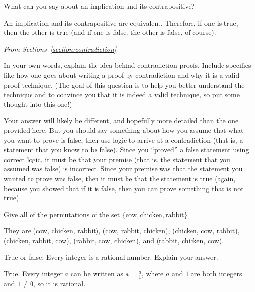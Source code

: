\begin{requ}
What can you say about an implication and its contrapositive?
\begin{requanswer}
An implication and its contrapositive are equivalent.
Therefore, if one is true, then the other is true
(and if one is false, the other is false, of course). 
\end{requanswer}
\end{requ}

\medskip
 
\noindent
{\em From Sections~\ref{section:contradiction}
\begin{requ}
In your own words, explain the idea behind contradiction proofs. Include specifics like how one goes about
writing a proof by contradiction and why it is a valid proof technique.
(The goal of this question is to help you better understand the technique and to convince you that it is indeed
a valid technique, so put some thought into this one!)
\begin{requanswer}
Your answer will likely be different, and hopefully more detailed than the one provided here.
But you should say something about how you assume that what you want to prove is false, 
then use logic to arrive at a contradiction (that is, a statement that you know to be false).
Since you ``proved'' a false statement using correct logic, it must be that your premise (that is, 
the statement that you assumed was false) is incorrect. Since your premise was that the statement
you wanted to prove was false, then it must be that the statement is true (again, because you 
showed that if it is false, then you can prove something that is not true).
\end{requanswer}
\end{requ}

\begin{requ}
Give all of the permutations of the set $\{\mbox{cow},\mbox{chicken},\mbox{rabbit}\}$
\begin{requanswer}
They are
(cow, chicken, rabbit),
(cow, rabbit, chicken),
(chicken, cow, rabbit),
(chicken, rabbit, cow), 
(rabbit, cow, chicken), and
(rabbit, chicken, cow).
\end{requanswer}
\end{requ}

\begin{requ}\label{intIsRat}
True or false: Every integer is a rational number. Explain your answer.
\begin{requanswer}
True. Every integer $a$ can be written as $a=\frac{a}{1}$, where $a$ and $1$ are both integers and $1\neq 0$, so it is rational.
\end{requanswer}
\end{requ}

}
